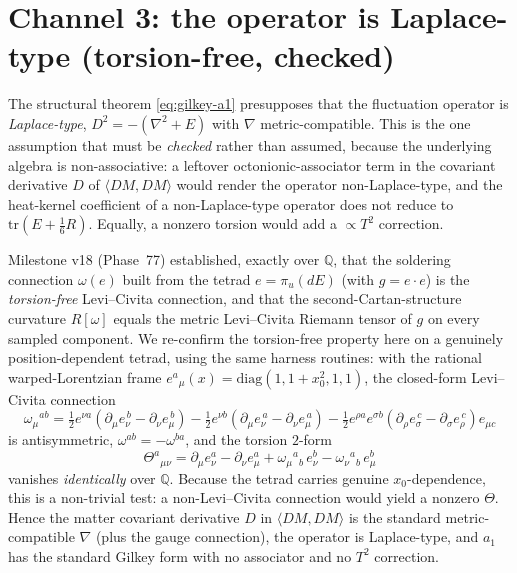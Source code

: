 \documentclass[11pt]{article}
\newcommand{\QQ}{\mathbb{Q}}
\newcommand{\tr}{\mathrm{tr}}
\begin{document}
\section{Channel 3: the operator is Laplace-type (torsion-free, checked)}\label{sec:torsion}

The structural theorem \eqref{eq:gilkey-a1} presupposes that the fluctuation operator is
\emph{Laplace-type}, $D^2=-(\nabla^2+E)$ with $\nabla$ metric-compatible. This is the one
assumption that must be \emph{checked} rather than assumed, because the underlying algebra is
non-associative: a leftover octonionic-associator term in the covariant derivative $D$ of
$\langle DM,DM\rangle$ would render the operator non-Laplace-type, and the heat-kernel
coefficient of a non-Laplace-type operator does not reduce to $\tr(E+\tfrac16 R)$. Equally, a
nonzero torsion would add a $\propto T^2$ correction.

Milestone v18 (Phase~77) established, exactly over $\QQ$, that the soldering connection
$\omega(e)$ built from the tetrad $e=\pi_u(dE)$ (with $g=e\cdot e$) is the \emph{torsion-free}
Levi--Civita connection, and that the second-Cartan-structure curvature $R[\omega]$ equals the
metric Levi--Civita Riemann tensor of $g$ on every sampled component. We re-confirm the
torsion-free property here on a genuinely position-dependent tetrad, using the same harness
routines: with the rational warped-Lorentzian frame $e^a{}_\mu(x)=\mathrm{diag}(1,1+x_0^2,1,1)$,
the closed-form Levi--Civita connection
\begin{equation}\label{eq:omega-formula}
\omega_\mu{}^{ab}=\tfrac12 e^{\nu a}\!\left(\partial_\mu e_\nu^{\,b}-\partial_\nu e_\mu^{\,b}\right)
-\tfrac12 e^{\nu b}\!\left(\partial_\mu e_\nu^{\,a}-\partial_\nu e_\mu^{\,a}\right)
-\tfrac12 e^{\rho a}e^{\sigma b}\!\left(\partial_\rho e_\sigma^{\,c}-\partial_\sigma e_\rho^{\,c}\right)e_{\mu c}
\end{equation}
is antisymmetric, $\omega^{ab}=-\omega^{ba}$, and the torsion $2$-form
\begin{equation}\label{eq:torsion}
\Theta^a{}_{\mu\nu}=\partial_\mu e^a_\nu-\partial_\nu e^a_\mu
+\omega_\mu{}^a{}_b\,e^b_\nu-\omega_\nu{}^a{}_b\,e^b_\mu
\end{equation}
vanishes \emph{identically} over $\QQ$. Because the tetrad carries genuine $x_0$-dependence,
this is a non-trivial test: a non-Levi--Civita connection would yield a nonzero $\Theta$.
Hence the matter covariant derivative $D$ in $\langle DM,DM\rangle$ is the standard
metric-compatible $\nabla$ (plus the gauge connection), the operator is Laplace-type, and
$a_1$ has the standard Gilkey form with no associator and no $T^2$ correction.
\end{document}
